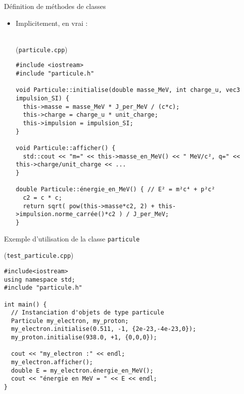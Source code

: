 \documentclass[c]{beamer}
\begin{document}

\begin{frame}[fragile]{Définition de méthodes de classes}

\begin{itemize}
\item Implicitement, en vrai \Cpp :\\\ \\
\begin{cbox}[][lwuc](\texttt{particule.cpp})
\begin{verbatim}
#include <iostream>
#include "particule.h"

void Particule::initialise(double masse_MeV, int charge_u, vec3 impulsion_SI) {
  this->masse = masse_MeV * J_per_MeV / (c*c);
  this->charge = charge_u * unit_charge;
  this->impulsion = impulsion_SI;
}

void Particule::afficher() {
  std::cout << "m=" << this->masse_en_MeV() << " MeV/c², q=" << this->charge/unit_charge << ...
}

double Particule::énergie_en_MeV() { // E² = m²c⁴ + p²c²
  c2 = c * c;
  return sqrt( pow(this->masse*c2, 2) + this->impulsion.norme_carrée()*c2 ) / J_per_MeV;
}
\end{verbatim}
\end{cbox}
\end{itemize}

\end{frame}


\begin{frame}[fragile]{Exemple d'utilisation de la classe \texttt{particule}}

\begin{cbox}[][lwuc](\texttt{test\_particule.cpp})
\begin{verbatim}
#include<iostream>
using namespace std;
#include "particule.h"

int main() {
  // Instanciation d'objets de type particule
  Particule my_electron, my_proton;
  my_electron.initialise(0.511, -1, {2e-23,-4e-23,0});
  my_proton.initialise(938.0, +1, {0,0,0});

  cout << "my_electron :" << endl;
  my_electron.afficher();
  double E = my_electron.énergie_en_MeV();
  cout << "énergie en MeV = " << E << endl;
}
\end{verbatim}
\end{cbox}

\end{frame}
\end{document}
